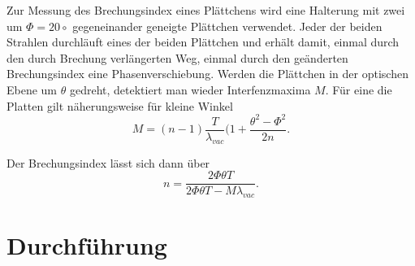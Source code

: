 Zur Messung des Brechungsindex eines Plättchens wird eine Halterung mit zwei um $\Phi = 20\circ$ gegeneinander geneigte Plättchen verwendet. Jeder der beiden Strahlen durchläuft eines der beiden Plättchen und erhält damit, einmal durch den durch Brechung verlängerten Weg, einmal durch den geänderten Brechungsindex eine Phasenverschiebung. Werden die Plättchen in der optischen Ebene um $\theta$ gedreht, detektiert man wieder Interfenzmaxima $M$.
Für eine die Platten gilt näherungsweise für kleine Winkel
\begin{equation}
	M = (n-1)\frac{T}{\lambda_{vac}}(1+\frac{\theta^2-\Phi^2}{2n}.
  \label{eq:index}
\end{equation}

Der Brechungsindex lässt sich dann über
\begin{equation}
	n = \frac{2\Phi \theta T}{2\Phi \theta T-M \lambda_{vac}}.
\end{equation}

	\section{Durchführung}

